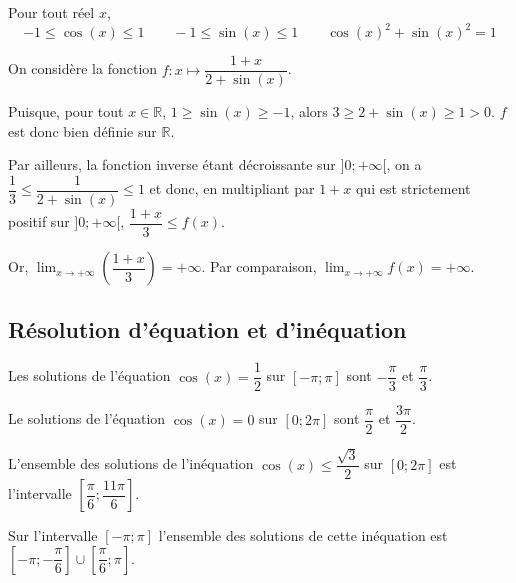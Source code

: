 \documentclass[11pt,fleqn, openany]{book} %
\begin{document}
\begin{proposition}
Pour tout réel $x$,
\[-1\leqslant \cos(x) \leqslant 1 \qquad -1\leqslant \sin(x) \leqslant 1 \qquad \cos(x)^2+\sin(x)^2=1\]
\vspace{-0.5cm}\end{proposition}


\begin{example}On considère la fonction $f:x \mapsto \dfrac{1+x}{2+\sin(x)}$.

Puisque, pour tout $x\in\mathbb{R}$, $1 \geqslant \sin(x) \geqslant -1$, alors $3 \geqslant 2+\sin(x)\geqslant 1 >0$. $f$ est donc bien définie sur $\mathbb{R}$. 

Par ailleurs, la fonction inverse étant décroissante sur $]0;+\infty [$, on a $\dfrac{1}{3} \leqslant \dfrac{1}{2+\sin(x)}\leqslant 1$ et donc, en multipliant par $1+x$ qui est strictement positif sur $]0;+\infty[$, $\dfrac{1+x}{3}\leqslant f(x)$. 

Or, $\displaystyle\lim_{x\to + \infty} \left(\dfrac{1+x}{3}\right)=+\infty$. Par comparaison, $\displaystyle\lim_{x\to +\infty}f(x)=+\infty$.\end{example}


\subsection{Résolution d'équation et d'inéquation}

\begin{example}Les solutions de l'équation $\cos(x)=\dfrac{1}{2}$ sur $[-\pi;\pi]$ sont $-\dfrac{\pi}{3}$ et $\dfrac{\pi}{3}$.\end{example}

\begin{example}Le solutions de l'équation $\cos(x)=0$ sur $[0;2\pi]$ sont $\dfrac{\pi}{2}$ et $\dfrac{3\pi}{2}$.\end{example}



\begin{example}L'ensemble des solutions de l'inéquation $\cos(x) \leqslant \dfrac{\sqrt{3}}{2}$ sur $[0;2\pi]$ est l'intervalle $\left[ \dfrac{\pi}{6};\dfrac{11\pi}{6}\right]$.

Sur l'intervalle $[-\pi;\pi]$ l'ensemble des solutions de cette inéquation est $\left[-\pi; -\dfrac{\pi}{6}\right]\cup\left[\dfrac{\pi}{6};\pi\right]$.\end{example}
\end{document}
